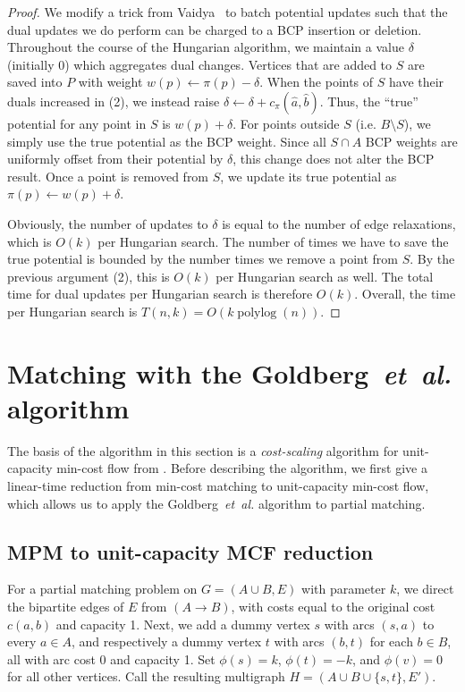 \documentclass[11pt]{article}
\def\etal{\textsl{et~al.}}
\def\polylog{\mathop{\mathrm{polylog}}}
\def\fsupply{\phi}
\theoremstyle{plain}
\begin{document}
\begin{proof}
	We modify a trick from Vaidya~\cite{Vaidya89} to batch potential 
	updates such that the dual updates we do perform can be charged to a 
	BCP insertion or deletion.
	Throughout the course of the Hungarian algorithm, we maintain a value
	$\delta$ (initially 0) which aggregates dual changes.
	Vertices that are added to $S$ are saved into $P$ with weight 
	$w(p) \gets \pi(p) - \delta$.
	When the points of $S$ have their duals increased in (2), we instead
	raise $\delta \gets \delta + c_\pi(\hat{a}, \hat{b})$.
	Thus, the ``true'' potential for any point in $S$ is $w(p) + \delta$.
	For points outside $S$ (i.e. $B \setminus S$), we simply use the true 
	potential as the BCP weight.
	Since all $S \cap A$ BCP weights are uniformly offset from their 
	potential by $\delta$, this change does not alter the BCP result.
	Once a point is removed from $S$, we update its true potential
	as $\pi(p) \gets w(p) + \delta$.

	Obviously, the number of updates to $\delta$ is equal to the number of 
	edge relaxations, which is $O(k)$ per Hungarian search.
	The number of times we have to save the true potential is bounded by
	the number times we remove a point from $S$.
	By the previous argument (2), this is $O(k)$ per Hungarian search as 
	well.
	The total time for dual updates per Hungarian search is therefore 
	$O(k)$.
	Overall, the time per Hungarian search is $T(n, k) = O(k\polylog(n))$.
\end{proof}


\section{Matching with the Goldberg~{\etal} algorithm}
\label{section:goldberg}

The basis of the algorithm in this section is a \emph{cost-scaling} algorithm 
for unit-capacity min-cost flow from \cite{GHKT17}.
Before describing the algorithm, we first give a linear-time reduction from 
min-cost matching to unit-capacity min-cost flow, which allows us to apply the 
Goldberg~{\etal} algorithm to partial matching.

\subsection{MPM to unit-capacity MCF reduction}
\label{subsection:mcm_mcf_reduction}

For a partial matching problem on $G = (A \cup B, E)$ with parameter $k$, we 
direct the bipartite edges of $E$ from $(A \to B)$, with costs equal to the 
original cost $c(a, b)$ and capacity 1.
Next, we add a dummy vertex $s$ with arcs $(s, a)$ to every $a \in A$,
and respectively a dummy vertex $t$ with arcs $(b, t)$ for each $b \in B$,
all with arc cost 0 and capacity 1.
Set $\fsupply(s) = k$, $\fsupply(t) = -k$, and $\fsupply(v) = 0$ for all other 
vertices.
Call the resulting multigraph $H = (A \cup B \cup \{s, t\}, E')$.
\end{document}
